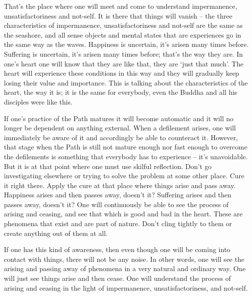 That's the place where one will meet and come to understand impermanence, unsatisfactoriness and not-self. It is there that things will vanish -- the three characteristics of impermanence, unsatisfactoriness and not-self are the same as the seashore, and all sense objects and mental states that are experiences go in the same way as the waves. Happiness is uncertain, it's arisen many times before. Suffering is uncertain, it's arisen many times before; that's the way they are. In one's heart one will know that they are like that, they are `just that much'. The heart will experience these conditions in this way and they will gradually keep losing their value and importance. This is talking about the characteristics of the heart, the way it is; it is the same for everybody, even the Buddha and all his disciples were like this. 

If one's practice of the Path matures it will become automatic and it will no longer be dependent on anything external. When a defilement arises, one will immediately be aware of it and accordingly be able to counteract it. However, that stage when the Path is still not mature enough nor fast enough to overcome the defilements is something that everybody has to experience -- it's unavoidable. But it is at that point where one must use skilful reflection. Don't go investigating elsewhere or trying to solve the problem at some other place. Cure it right there. Apply the cure at that place where things arise and pass away.  Happiness arises and then passes away, doesn't it? Suffering arises and then passes away, doesn't it? One will continuously be able to see the process of arising and ceasing, and see that which is good and bad in the heart. These are phenomena that exist and are part of nature. Don't cling tightly to them or create anything out of them at all.

If one has this kind of awareness, then even though one will be coming into contact with things, there will not be any noise. In other words, one will see the arising and passing away of phenomena in a very natural and ordinary way. One will just see things arise and then cease. One will understand the process of arising and ceasing in the light of impermanence, unsatisfactoriness, and not-self.

